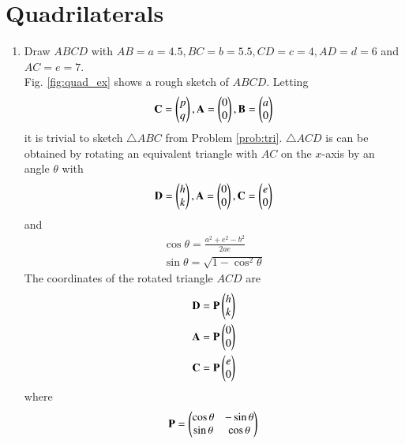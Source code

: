 \documentclass[journal,12pt,twocolumn]{IEEEtran}
\renewcommand\thesection{\arabic{section}}
\begin{document}
\section{Quadrilaterals}
\begin{enumerate}[label=\thesection.\arabic*
,ref=\thesection.\theenumi]
\item Draw $ABCD$ with $AB=a=4.5, BC  =b=5.5, CD =c= 4, AD =d=6$ and $AC=e = 7$.
\\
\solution Fig. \ref{fig:quad_ex} shows a rough sketch of $ABCD$. Letting
\begin{align}
\label{eq:tri_basic_new}
\mathbf{C} = \begin{pmatrix}p\\q\end{pmatrix}, \mathbf{A} = \begin{pmatrix}0\\0\end{pmatrix}, \mathbf{B} = \begin{pmatrix}a\\0\end{pmatrix}
\end{align}
%
it is trivial to sketch $\triangle ABC$ from  Problem \ref{prob:tri}.
%
$\triangle ACD$ is can be obtained by rotating an equivalent triangle with $AC$ on
the $x$-axis by an angle $\theta$ with
\begin{align}
\label{eq:tri_basic_rot}
\mathbf{D} = \begin{pmatrix}h\\k\end{pmatrix}, \mathbf{A} = \begin{pmatrix}0\\0\end{pmatrix}, \mathbf{C} = \begin{pmatrix}e\\0\end{pmatrix}
\end{align}
%
and
\begin{align}
\label{eq:tri_rot_ang}
\cos \theta = \frac{a^2+e^2-b^2}{2ae}
\\
\sin \theta = \sqrt{1-\cos^2\theta}
\end{align}
%
The coordinates of the rotated triangle $ACD$ are
\begin{align}
\label{eq:tri_rot_trans}
\mathbf{D} = \mathbf{P}\begin{pmatrix}h\\k\end{pmatrix}
\\
\mathbf{A} = \mathbf{P}\begin{pmatrix}0\\0\end{pmatrix}
\\
\mathbf{C} = \mathbf{P}\begin{pmatrix}e\\0\end{pmatrix}
\end{align}
%
where 
\begin{align}
\label{eq:tri_rot_mat}
\mathbf{P} = \begin{pmatrix}\cos\theta & -\sin \theta\\ \sin \theta & \cos \theta\end{pmatrix}
\end{align}
\begin{figure}[!ht]

\end{figure}
\end{enumerate}
\end{document}
